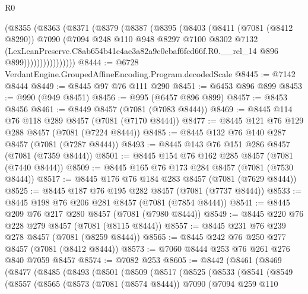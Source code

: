 \begin{lexlean}{R0}
\begin{coremodule}
                (@8355
                  (@8363
                    (@8371
                      (@8379
                        (@8387
                          (@8395
                            (@8403
                              (@8411
                                (@7081 (@8412 @8290))
                                @7090
                                (@7094
                                  @248
                                  @110
                                  @948
                                  @8297
                                  @7100
                                  @8302
                                  @7132
                                  (LexLeanPreserve.C8ab654b41c4ae3a82a9c0ebaf6fcd66f.R0.__rel_14
                                    @896
                                    @899))))))))))))))))
@8444 := @6728 VerdantEngine.GroupedAffineEncoding.Program.decodedScale
@8445 := @7142 @8444
@8449 := @8445 @97 @76 @111 @290
@8451 := @6453 @896 @899
@8453 := @990 (@949 @8451)
@8456 := @995 (@6457 @896 @899)
@8457 := @8453 @8456
@8461 := @8449 @8457 (@7081 (@7083 @8444))
@8469 := @8445 @114 @76 @118 @289 @8457 (@7081 (@7170 @8444))
@8477 := @8445 @121 @76 @129 @288 @8457 (@7081 (@7224 @8444))
@8485 := @8445 @132 @76 @140 @287 @8457 (@7081 (@7287 @8444))
@8493 := @8445 @143 @76 @151 @286 @8457 (@7081 (@7359 @8444))
@8501 := @8445 @154 @76 @162 @285 @8457 (@7081 (@7440 @8444))
@8509 := @8445 @165 @76 @173 @284 @8457 (@7081 (@7530 @8444))
@8517 := @8445 @176 @76 @184 @283 @8457 (@7081 (@7629 @8444))
@8525 := @8445 @187 @76 @195 @282 @8457 (@7081 (@7737 @8444))
@8533 := @8445 @198 @76 @206 @281 @8457 (@7081 (@7854 @8444))
@8541 := @8445 @209 @76 @217 @280 @8457 (@7081 (@7980 @8444))
@8549 := @8445 @220 @76 @228 @279 @8457 (@7081 (@8115 @8444))
@8557 := @8445 @231 @76 @239 @278 @8457 (@7081 (@8259 @8444))
@8565 := @8445 @242 @76 @250 @277 @8457 (@7081 (@8412 @8444))
@8573 := @7060 @8444 @253 @76 @261 @276 @840 @7059 @8457
@8574 := @7082 @253
@8605 := @8442
    (@8461
      (@8469
        (@8477
          (@8485
            (@8493
              (@8501
                (@8509
                  (@8517
                    (@8525
                      (@8533
                        (@8541
                          (@8549
                            (@8557
                              (@8565
                                (@8573
                                  (@7081 (@8574 @8444))
                                  @7090
                                  (@7094
                                    @259
                                    @110

\end{coremodule}
\end{lexlean}
